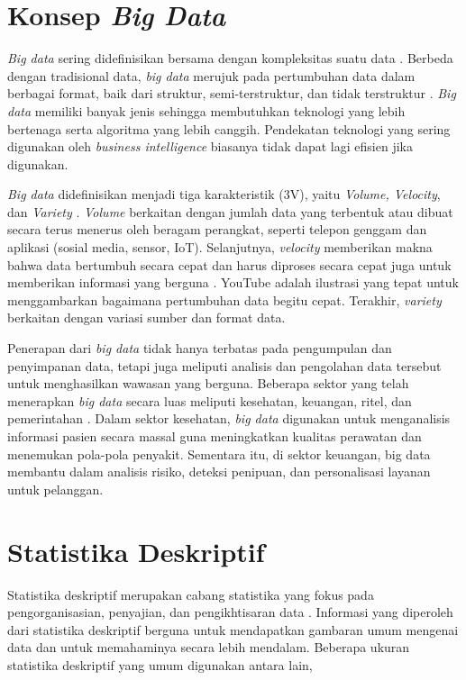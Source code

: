 \section{Konsep \textit{Big Data}}
\textit{Big data} sering didefinisikan bersama dengan kompleksitas suatu data \cite{barosenAnalysisComparisonInterfacing2018}. Berbeda dengan tradisional data, \textit{big data} merujuk pada pertumbuhan data dalam berbagai format, baik dari struktur, semi-terstruktur, dan tidak terstruktur \cite{oussousBigDataTechnologies2018}. \textit{Big data} memiliki banyak jenis sehingga membutuhkan teknologi yang lebih bertenaga serta algoritma yang lebih canggih. Pendekatan teknologi yang sering digunakan oleh \textit{business intelligence} biasanya tidak dapat lagi efisien jika digunakan.

\textit{Big data} didefinisikan menjadi tiga karakteristik (3V), yaitu \textit{Volume, Velocity}, dan \textit{Variety} \cite{furhtIntroductionBigData2016}. \textit{Volume} berkaitan dengan jumlah data yang terbentuk atau dibuat secara terus menerus oleh beragam  perangkat, seperti telepon genggam dan aplikasi (sosial media, sensor, IoT). Selanjutnya, \textit{velocity} memberikan makna bahwa data bertumbuh secara cepat dan harus diproses secara cepat juga untuk memberikan informasi yang berguna \cite{sandhuBigDataCloud2022}. YouTube adalah ilustrasi yang tepat untuk menggambarkan bagaimana pertumbuhan data begitu cepat. Terakhir, \textit{variety} berkaitan dengan variasi sumber dan format data. 

Penerapan dari \textit{big data} tidak hanya terbatas pada pengumpulan dan penyimpanan data, tetapi juga meliputi analisis dan pengolahan data tersebut untuk menghasilkan wawasan yang berguna. Beberapa sektor yang telah menerapkan \textit{big data} secara luas meliputi kesehatan, keuangan, ritel, dan pemerintahan \cite{oussousBigDataTechnologies2018}. Dalam sektor kesehatan, \textit{big data} digunakan untuk menganalisis informasi pasien secara massal guna meningkatkan kualitas perawatan dan menemukan pola-pola penyakit. Sementara itu, di sektor keuangan, big data membantu dalam analisis risiko, deteksi penipuan, dan personalisasi layanan untuk pelanggan.

\section{Statistika Deskriptif}
Statistika deskriptif merupakan cabang statistika yang fokus pada pengorganisasian, penyajian, dan pengikhtisaran data \cite{rossIntroductoryStatistics2017}. Informasi yang diperoleh dari statistika deskriptif berguna untuk mendapatkan gambaran umum mengenai data dan untuk memahaminya secara lebih mendalam. Beberapa ukuran statistika deskriptif yang umum digunakan antara lain,

